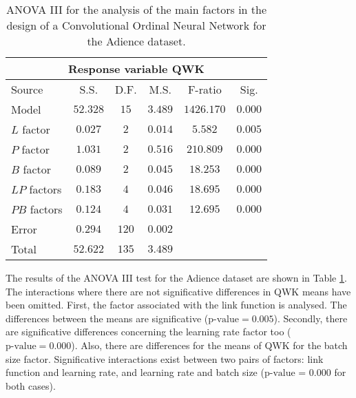 \documentclass[journal]{IEEEtran}
\begin{document}
	\begin{table}[!t]
		\caption{ANOVA III for the analysis of the main factors in the design of a Convolutional Ordinal Neural Network for the Adience dataset.}
		\label{table:ANOVAAdience}
		\centering
		\small
		\begin{tabular}{l|ccccc}
			\multicolumn{6}{c}{Response variable QWK}\\\hline
			Source & S.S. & D.F. & M.S. & F-ratio & Sig.\\\hline
			Model & $52.328$ & $15$ & $3.489$ & $1426.170$ & $0.000$\\
			$L$ factor & $0.027$ & $2$ & $0.014$ & $5.582$ & $0.005$\\
			$P$ factor & $1.031$ & $2$ & $0.516$ & $210.809$ & $0.000$\\
			$B$ factor & $0.089$ & $2$ & $0.045$ & $18.253$ & $0.000$\\
			$LP$ factors & $0.183$ & $4$ & $0.046$ & $18.695$ & $0.000$\\
			$PB$ factors & $0.124$ & $4$ & $0.031$ & $12.695$ & $0.000$\\
			Error & $0.294$ & $120$ & $0.002$ & & \\
			Total & $52.622$ & $135$ & $3.489$ & & 
		\end{tabular}
	\end{table}
	
	The results of the ANOVA III test for the Adience dataset are shown in Table \ref{table:ANOVAAdience}. The interactions where there are not significative differences in QWK means have been omitted. First, the factor associated with the link function is analysed. The differences between the means are significative ($\text{p-value} = 0.005$). Secondly, there are significative differences concerning the learning rate factor too ($\text{p-value} = 0.000$). Also, there are differences for the means of QWK for the batch size factor. Significative interactions exist between two pairs of factors: link function and learning rate, and learning rate and batch size ($\text{p-value = 0.000}$ for both cases).
	
\end{document}
